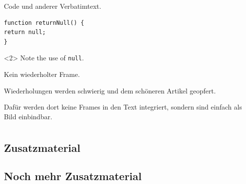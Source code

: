 \begin{frame}[fragile]{Code und anderer Verbatimtext.}
\begin{verbatim}
function returnNull() {
return null;
}
\end{verbatim}
\begin{uncoverenv}<2>
Note the use of \verb|null|.
\end{uncoverenv}
\end{frame}

	\begin{frame}{Kein wiederholter Frame.}

		Wiederholungen werden schwierig und dem schöneren Artikel geopfert.

		Dafür werden dort keine Frames in den Text integriert, sondern sind einfach als Bild einbindbar.

	\end{frame}







	\appendix

	\section{\appendixname}

	\frame{\tableofcontents}

	\subsection{Zusatzmaterial}


	\subsection{Noch mehr Zusatzmaterial}





